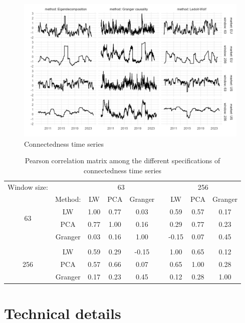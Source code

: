 \documentclass[12pt]{article}
\begin{document}
\begin{figure}
	\centering
	\includegraphics[scale = 0.8]{img/connect_ts_app.png}
	\caption{Connectedness time series}
	\label{figure:connect_ts_app}
\end{figure}


\begin{table}[ht]
	\begin{center}
		\begin{tabular}{cc|ccccccc}
			Window size: & & \multicolumn{3}{c}{63} & & \multicolumn{3}{c}{256}\\
			\multirow{4}{*}{63} & Method: & LW & PCA & Granger & & LW & PCA & Granger\\
			\hline
			& LW & 1.00 & 0.77 & 0.03 && 0.59 & 0.57 & 0.17 \\
			& PCA & 0.77 & 1.00 & 0.16 && 0.29 & 0.77 & 0.23  \\
			& Granger & 0.03 & 0.16 & 1.00 && -0.15 & 0.07 & 0.45 \\
			&&&&&&&&\\
			\multirow{3}{*}{256} & LW  & 0.59 & 0.29 & -0.15 && 1.00 & 0.65 & 0.12 \\
			  & PCA & 0.57 & 0.66 & 0.07 && 0.65 & 1.00 & 0.28 \\
			  & Granger & 0.17 & 0.23 & 0.45 && 0.12 & 0.28 & 1.00 \\
		\end{tabular}
	\end{center}
	\caption{Pearson correlation matrix among the different specifications of connectedness time series}
	\label{figure:cor_matrix}
\end{table}

\section{Technical details}\label{appendix:technical}
\end{document}
